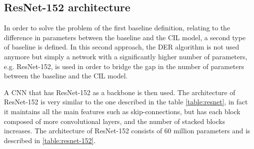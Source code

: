 \subsection{ResNet-152 architecture}
In order to solve the problem of the first baseline definition, relating to the difference in parameters between the baseline and the CIL model, a second type of baseline is defined. In this second approach, the DER algorithm is not used anymore but simply a network with a significantly higher number of parameters, e.g. ResNet-152, is used in order to bridge the gap in the number of parameters between the baseline and the CIL model.

A CNN that has ResNet-152 as a backbone is then used. The architecture of ResNet-152 is very similar to the one described in the table \autoref{table:resnet}, in fact it maintains all the main features such as skip-connections, but has each block composed of more convolutional layers, and the number of stacked blocks increases. The architecture of ResNet-152 consists of 60 million parameters and is described in \autoref{table:resnet-152}.


